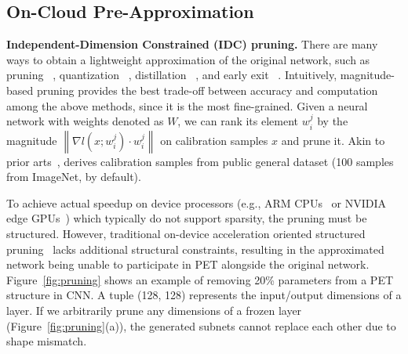 
\subsection{On-Cloud Pre-Approximation}
\label{subsec:proxy network generation}

% 

\textbf{Independent-Dimension Constrained (IDC) pruning.}
There are many ways to obtain a lightweight approximation of the original network, such as pruning ~\cite{torchpruninggithub, huang2018multiscale}, quantization ~\cite{frantar2023gptq}, distillation ~\cite{aguilar2020knowledge}, and early exit ~\cite{xin-etal-2020-deebert}.
Intuitively, magnitude-based pruning provides the best trade-off between accuracy and computation among the above methods, since it is the most fine-grained.
Given a neural network with weights denoted as $W$, we can rank its element $w_{i}^{j}$ by the magnitude $\left\| \nabla l(x; w_{i}^{j})\cdot w_{i}^{j} \right\|$ on calibration samples $x$ and prune it.
Akin to prior arts~\cite{ma2023llmprunerstructuralpruninglarge, fang2023depgraphstructuralpruning}, \sys derives calibration samples from public general dataset (100 samples from ImageNet, by default).

To achieve actual speedup on device processors (e.g., ARM CPUs~\cite{HuaWei, mi10} or NVIDIA edge GPUs~\cite{tx2}) which typically do not support sparsity, the pruning must be structured.
However, traditional on-device acceleration oriented structured pruning~\cite{ofagithub, torchpruninggithub} lacks additional structural constraints, resulting in the approximated network being unable to participate in PET alongside the original network.
Figure~\ref{fig:pruning} shows an example of removing 20\% parameters from a PET structure in CNN.
A tuple (128, 128) represents the input/output dimensions of a layer.
If we arbitrarily prune any dimensions of a frozen layer (Figure~\ref{fig:pruning}(a)), the generated subnets cannot replace each other due to shape mismatch.

